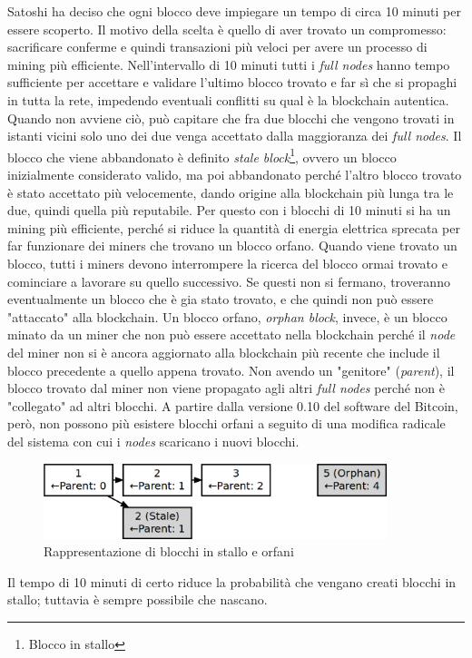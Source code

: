 \documentclass {article}
\begin{document}
Satoshi ha deciso che ogni blocco deve impiegare un tempo di circa 10 minuti per essere scoperto.
Il motivo della scelta è quello di aver trovato un compromesso: sacrificare conferme e quindi transazioni più veloci per avere un processo di mining più efficiente.
Nell'intervallo di 10 minuti tutti i \textit{full nodes} hanno tempo sufficiente per accettare e validare l'ultimo blocco trovato e far sì che si propaghi in tutta la rete, impedendo eventuali conflitti su qual è la blockchain autentica. %
Quando non avviene ciò, può capitare che fra due blocchi che vengono trovati in istanti vicini solo uno dei due venga accettato dalla maggioranza dei \textit{full nodes}.
Il blocco che viene abbandonato è definito \textit{stale block}\footnote{Blocco in stallo}, ovvero un blocco inizialmente considerato valido, ma poi abbandonato perché l'altro blocco trovato è stato accettato più velocemente, dando origine alla blockchain più lunga tra le due, quindi quella più reputabile.
Per questo con i blocchi di 10 minuti si ha un mining più efficiente, perché si riduce la quantità di energia elettrica sprecata per far funzionare dei miners che trovano un blocco orfano.
Quando viene trovato un blocco, tutti i miners devono interrompere la ricerca del blocco ormai trovato e cominciare a lavorare su quello successivo.
Se questi non si fermano, troveranno eventualmente un blocco che è gia stato trovato, e che quindi non può essere "attaccato" alla blockchain.
Un blocco orfano, \textit{orphan block}, invece, è un blocco minato da un miner che non può essere accettato nella blockchain perché il \textit{node} del miner non si è ancora aggiornato alla blockchain più recente che include il blocco precedente a quello appena trovato.
Non avendo un "genitore" (\textit{parent}), il blocco trovato dal miner non viene propagato agli altri \textit{full nodes} perché non è "collegato" ad altri blocchi.
A partire dalla versione 0.10 del software del Bitcoin, però, non possono più esistere blocchi orfani a seguito di una modifica radicale del sistema con cui i \textit{nodes} scaricano i nuovi blocchi.

\vspace {0.5cm}
\begin{figure}[htb!]
\includegraphics [width = 10cm] {stale-orphan.png}
\centering
\caption {Rappresentazione di blocchi in stallo e orfani}
\end{figure}
\vspace {0.2cm}
%
Il tempo di 10 minuti di certo riduce la probabilità che vengano creati blocchi in stallo; tuttavia è sempre possibile che nascano.
\end{document}
